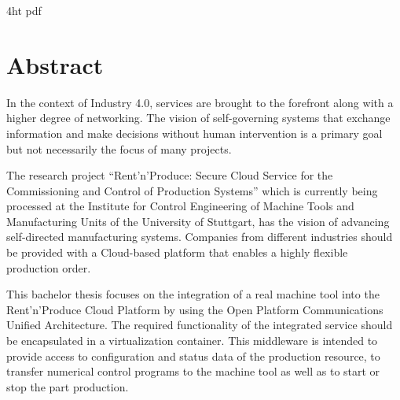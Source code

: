 \documentclass[
a4paper,
twoside,
headsepline,
cleardoublepage=empty,
parskip=half,
draft=false
]{scrbook}
\begin{document}
	\iftex4ht
	\Configure{$}{\PicMath}{\EndPicMath}{}
	{pdf}
	{%
	}
	\fi

	


	
	\Titelblatt

	\pagestyle{preamble}
	\renewcommand*{\chapterpagestyle}{preamble}

	\section*{Abstract}

		In the context of Industry 4.0, services are brought to the forefront along with a higher degree of networking.
		The vision of self-governing systems that exchange information and make decisions without human intervention is a primary goal but not necessarily the focus of many projects.

		The research project ``Rent'n'Produce: Secure Cloud Service for the Commissioning and Control of Production Systems'' which is currently being processed at the Institute for Control Engineering of Machine Tools and Manufacturing Units of the University of Stuttgart, has the vision of advancing self-directed manufacturing systems.
		Companies from different industries should be provided with a Cloud-based platform that enables a highly flexible production order.

		This bachelor thesis focuses on the integration of a real machine tool into the Rent'n'Produce Cloud Platform by using the Open Platform Communications Unified Architecture.
		The required functionality of the integrated service should be encapsulated in a virtualization container.
		This middleware is intended to provide access to configuration and status data of the production resource, to transfer numerical control programs to the machine tool as well as to start or stop the part production.
\end{document}
